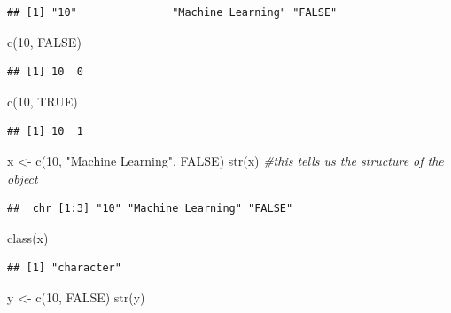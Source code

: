 \documentclass[
]{book}
\newenvironment{Shaded}{\begin{snugshade}}{\end{snugshade}}
\newcommand{\CommentTok}[1]{\textcolor[rgb]{0.56,0.35,0.01}{\textit{#1}}}
\newcommand{\ConstantTok}[1]{\textcolor[rgb]{0.00,0.00,0.00}{#1}}
\newcommand{\DecValTok}[1]{\textcolor[rgb]{0.00,0.00,0.81}{#1}}
\newcommand{\FunctionTok}[1]{\textcolor[rgb]{0.00,0.00,0.00}{#1}}
\newcommand{\NormalTok}[1]{#1}
\newcommand{\OtherTok}[1]{\textcolor[rgb]{0.56,0.35,0.01}{#1}}
\newcommand{\StringTok}[1]{\textcolor[rgb]{0.31,0.60,0.02}{#1}}
\theoremstyle{definition}
\theoremstyle{definition}
\theoremstyle{definition}
\theoremstyle{definition}
\theoremstyle{remark}
\begin{document}
\begin{verbatim}
## [1] "10"               "Machine Learning" "FALSE"
\end{verbatim}

\begin{Shaded}
\begin{Highlighting}[]
\FunctionTok{c}\NormalTok{(}\DecValTok{10}\NormalTok{, }\ConstantTok{FALSE}\NormalTok{)}
\end{Highlighting}
\end{Shaded}

\begin{verbatim}
## [1] 10  0
\end{verbatim}

\begin{Shaded}
\begin{Highlighting}[]
\FunctionTok{c}\NormalTok{(}\DecValTok{10}\NormalTok{, }\ConstantTok{TRUE}\NormalTok{)}
\end{Highlighting}
\end{Shaded}

\begin{verbatim}
## [1] 10  1
\end{verbatim}

\begin{Shaded}
\begin{Highlighting}[]
\NormalTok{x }\OtherTok{\textless{}{-}} \FunctionTok{c}\NormalTok{(}\DecValTok{10}\NormalTok{, }\StringTok{"Machine Learning"}\NormalTok{, }\ConstantTok{FALSE}\NormalTok{) }
\FunctionTok{str}\NormalTok{(x) }\CommentTok{\#this tells us the structure of the object}
\end{Highlighting}
\end{Shaded}

\begin{verbatim}
##  chr [1:3] "10" "Machine Learning" "FALSE"
\end{verbatim}

\begin{Shaded}
\begin{Highlighting}[]
\FunctionTok{class}\NormalTok{(x)}
\end{Highlighting}
\end{Shaded}

\begin{verbatim}
## [1] "character"
\end{verbatim}

\begin{Shaded}
\begin{Highlighting}[]
\NormalTok{y }\OtherTok{\textless{}{-}} \FunctionTok{c}\NormalTok{(}\DecValTok{10}\NormalTok{, }\ConstantTok{FALSE}\NormalTok{)}
\FunctionTok{str}\NormalTok{(y)}
\end{Highlighting}
\end{Shaded}
\end{document}
